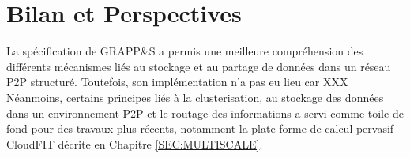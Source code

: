 \section{Bilan et Perspectives}


La spécification de GRAPP\&S a permis une meilleure compréhension des différents mécanismes liés au stockage et au partage de données dans un réseau P2P structuré. Toutefois, son implémentation n'a pas eu lieu car XXX
Néanmoins, certains principes liés à la clusterisation, au stockage des données dans un environnement P2P et le routage des informations a servi comme toile de fond pour des travaux plus récents, notamment la plate-forme de calcul pervasif CloudFIT décrite en  Chapitre \ref{SEC:MULTISCALE}.  
